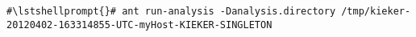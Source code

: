 \begin{lstlisting}[caption=Command to compile and run the instrumented Bookstore via ant]
#\lstshellprompt{}# ant run-analysis -Danalysis.directory /tmp/kieker-20120402-163314855-UTC-myHost-KIEKER-SINGLETON
\end{lstlisting}%
